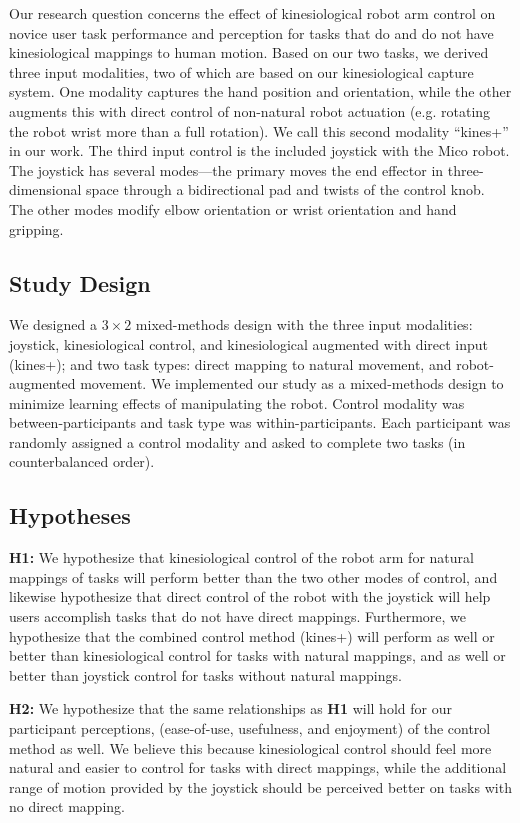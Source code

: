 \documentclass{sigchi}
\begin{document}
Our research question concerns the effect of kinesiological robot arm control on novice user task performance and perception for tasks that do and do not have kinesiological mappings to human motion.  Based on our two tasks, we derived three input modalities, two of which are based on our kinesiological capture system.  One modality captures the hand position and orientation, while the other augments this with direct control of non-natural robot actuation (e.g. rotating the robot wrist more than a full rotation).  We call this second modality ``kines+'' in our work. The third input control is the included joystick with the Mico robot.  The joystick has several modes---the primary moves the end effector in three-dimensional space through a bidirectional pad and twists of the control knob.  The other modes modify elbow orientation or wrist orientation and hand gripping.  

\subsection{Study Design}

We designed a $3\times2$ mixed-methods design with the three input modalities: joystick, kinesiological control, and kinesiological augmented with direct input (kines+); and two task types: direct mapping to natural movement, and robot-augmented movement.  We implemented our study as a mixed-methods design to minimize learning effects of manipulating the robot. Control modality was between-participants and task type was within-participants. Each participant was randomly assigned a control modality and asked to complete two tasks (in counterbalanced order).

\subsection{Hypotheses}

\textbf{H1:} We hypothesize that kinesiological control of the robot arm for natural mappings of tasks will perform better than the two other modes of control, and likewise hypothesize that direct control of the robot with the joystick will help users accomplish tasks that do not have direct mappings. Furthermore, we hypothesize that the combined control method (kines+) will perform as well or better than kinesiological control for tasks with natural mappings, and as well or better than joystick control for tasks without natural mappings.

\textbf{H2:} We hypothesize that the same relationships as \textbf{H1} will hold for our participant perceptions, (ease-of-use, usefulness, and enjoyment) of the control method as well. We believe this because kinesiological control should feel more natural and easier to control for tasks with direct mappings, while the additional range of motion provided by the joystick should be perceived better on tasks with no direct mapping. 
\end{document}

